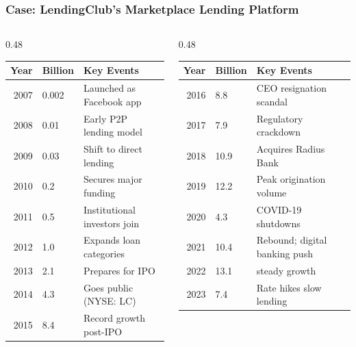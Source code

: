 \documentclass[aspectratio=169,xcolor=dvipsnames]{beamer}
\begin{document}

\begin{frame}
\frametitle{Case: LendingClub's Marketplace Lending Platform}


\footnotesize
\begin{columns}[T]
    \begin{column}{0.48\textwidth}
        \begin{tabular}{rlp{3.5cm}}
            \toprule
            \textbf{Year} & \textbf{Billion} & \textbf{Key Events} \\
            \midrule
            2007 & 0.002 & Launched as Facebook app \\
            2008 & 0.01 & Early P2P lending model \\
            2009 & 0.03 & Shift to direct lending \\
            2010 & 0.2 & Secures major funding \\
            2011 & 0.5 & Institutional investors join \\
            2012 & 1.0 & Expands loan categories \\
            2013 & 2.1 & Prepares for IPO \\
            2014 & 4.3 & Goes public (NYSE: LC) \\
            2015 & 8.4 & Record growth post-IPO \\
            \bottomrule
        \end{tabular}
    \end{column}

    \begin{column}{0.48\textwidth}
        \begin{tabular}{rlp{3.5cm}}
            \toprule
            \textbf{Year} & \textbf{Billion} & \textbf{Key Events} \\
            \midrule
            2016 & 8.8 & CEO resignation scandal \\
            2017 & 7.9 & Regulatory crackdown \\
            2018 & 10.9 & Acquires Radius Bank \\
            2019 & 12.2 & Peak origination volume \\
            2020 & 4.3 & COVID-19 shutdowns \\
            2021 & 10.4 & Rebound; digital banking push \\
            2022 & 13.1 & steady growth \\
            2023 & 7.4 & Rate hikes slow lending \\
            \bottomrule
        \end{tabular}
    \end{column}
\end{columns}




\end{frame} 
\end{document}
